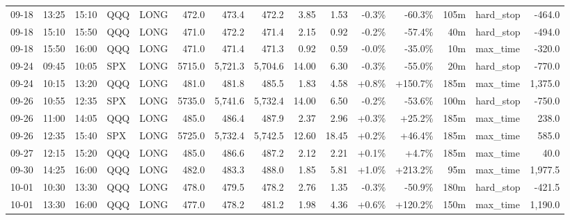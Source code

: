 \documentclass[11pt,a4paper,twoside]{article}
\begin{document}
\begin{landscape}
\begin{center}
\begin{longtable}{>{\color{txtmain}}l l l l l r r r r r r r r >{\color{txtmain}}l r}
09-18 & 13:25 & 15:10 & QQQ & LONG & 472.0 & 473.4 & 472.2 & 3.85 & 1.53 & \textcolor{lossred}{-0.3\%} & \textcolor{lossred}{-60.3\%} & 105m & hard\_stop & \textcolor{lossred}{-464.0} \\
09-18 & 15:10 & 15:50 & QQQ & LONG & 471.0 & 472.2 & 471.4 & 2.15 & 0.92 & \textcolor{lossred}{-0.2\%} & \textcolor{lossred}{-57.4\%} & 40m & hard\_stop & \textcolor{lossred}{-494.0} \\
09-18 & 15:50 & 16:00 & QQQ & LONG & 471.0 & 471.4 & 471.3 & 0.92 & 0.59 & \textcolor{lossred}{-0.0\%} & \textcolor{lossred}{-35.0\%} & 10m & max\_time & \textcolor{lossred}{-320.0} \\
09-24 & 09:45 & 10:05 & SPX & LONG & 5715.0 & 5,721.3 & 5,704.6 & 14.00 & 6.30 & \textcolor{lossred}{-0.3\%} & \textcolor{lossred}{-55.0\%} & 20m & hard\_stop & \textcolor{lossred}{-770.0} \\
09-24 & 10:15 & 13:20 & QQQ & LONG & 481.0 & 481.8 & 485.5 & 1.83 & 4.58 & \textcolor{wingreen}{+0.8\%} & \textcolor{wingreen}{+150.7\%} & 185m & max\_time & \textcolor{wingreen}{1,375.0} \\
09-26 & 10:55 & 12:35 & SPX & LONG & 5735.0 & 5,741.6 & 5,732.4 & 14.00 & 6.50 & \textcolor{lossred}{-0.2\%} & \textcolor{lossred}{-53.6\%} & 100m & hard\_stop & \textcolor{lossred}{-750.0} \\
09-26 & 11:00 & 14:05 & QQQ & LONG & 485.0 & 486.4 & 487.9 & 2.37 & 2.96 & \textcolor{wingreen}{+0.3\%} & \textcolor{wingreen}{+25.2\%} & 185m & max\_time & \textcolor{wingreen}{238.0} \\
09-26 & 12:35 & 15:40 & SPX & LONG & 5725.0 & 5,732.4 & 5,742.5 & 12.60 & 18.45 & \textcolor{wingreen}{+0.2\%} & \textcolor{wingreen}{+46.4\%} & 185m & max\_time & \textcolor{wingreen}{585.0} \\
09-27 & 12:15 & 15:20 & QQQ & LONG & 485.0 & 486.6 & 487.2 & 2.12 & 2.21 & \textcolor{wingreen}{+0.1\%} & \textcolor{wingreen}{+4.7\%} & 185m & max\_time & \textcolor{wingreen}{40.0} \\
09-30 & 14:25 & 16:00 & QQQ & LONG & 482.0 & 483.3 & 488.0 & 1.85 & 5.81 & \textcolor{wingreen}{+1.0\%} & \textcolor{wingreen}{+213.2\%} & 95m & max\_time & \textcolor{wingreen}{1,977.5} \\
10-01 & 10:30 & 13:30 & QQQ & LONG & 478.0 & 479.5 & 478.2 & 2.76 & 1.35 & \textcolor{lossred}{-0.3\%} & \textcolor{lossred}{-50.9\%} & 180m & hard\_stop & \textcolor{lossred}{-421.5} \\
10-01 & 13:30 & 16:00 & QQQ & LONG & 477.0 & 478.2 & 481.2 & 1.98 & 4.36 & \textcolor{wingreen}{+0.6\%} & \textcolor{wingreen}{+120.2\%} & 150m & max\_time & \textcolor{wingreen}{1,190.0} \\

\end{longtable}
\end{center}
\end{landscape}
\end{document}
